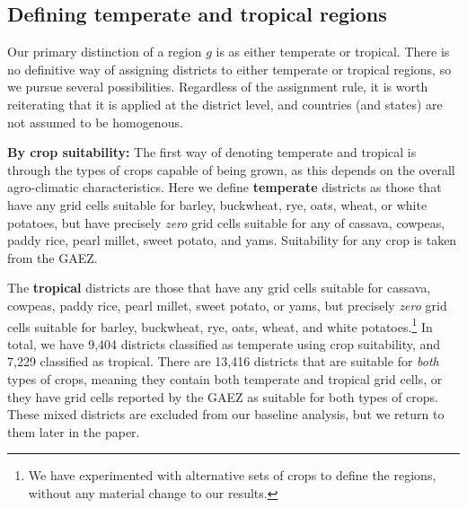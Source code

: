 \documentclass[11pt]{article}
\begin{document}
\subsection{Defining temperate and tropical regions}
Our primary distinction of a region $g$ is as either temperate or tropical. There is no definitive way of assigning districts to either temperate or tropical regions, so we pursue several possibilities. Regardless of the assignment rule, it is worth reiterating that it is applied at the district level, and countries (and states) are not assumed to be homogenous. 

\vspace{.5cm}\noindent\textbf{By crop suitability:} The first way of denoting temperate and tropical is through the types of crops capable of being grown, as this depends on the overall agro-climatic characteristics. Here we define \textbf{temperate} districts as those that have any grid cells suitable for barley, buckwheat, rye, oats, wheat, or white potatoes, but have precisely \textit{zero} grid cells suitable for any of cassava, cowpeas, paddy rice, pearl millet, sweet potato, and yams. Suitability for any crop is taken from the GAEZ.

The \textbf{tropical} districts are those that have any grid cells suitable for cassava, cowpeas, paddy rice, pearl millet, sweet potato, or yams, but precisely \textit{zero} grid cells suitable for barley, buckwheat, rye, oats, wheat, and white potatoes.\footnote{We have experimented with alternative sets of crops to define the regions, without any material change to our results.} In total, we have 9,404 districts classified as temperate using crop suitability, and 7,229 classified as tropical. There are 13,416 districts that are suitable for \textit{both} types of crops, meaning they contain both temperate and tropical grid cells, or they have grid cells reported by the GAEZ as suitable for both types of crops. These mixed districts are excluded from our baseline analysis, but we return to them later in the paper.
\end{document}
